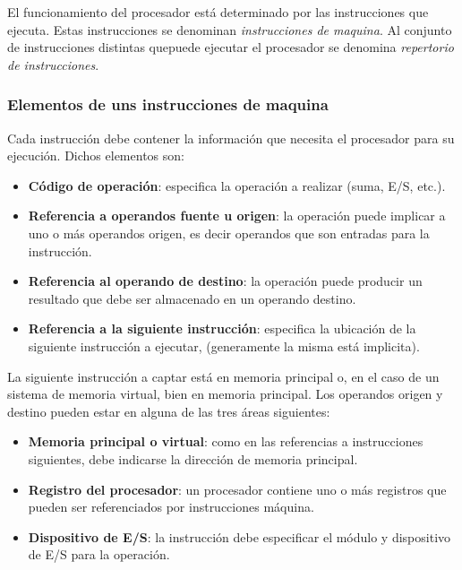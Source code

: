 El funcionamiento del procesador está determinado por las instrucciones que ejecuta. Estas instrucciones se denominan \textit{instrucciones de maquina}. Al conjunto de instrucciones distintas quepuede ejecutar el procesador se denomina \textit{repertorio de instrucciones}.

\begin{subs}
  \subsubsection{Elementos de uns instrucciones de maquina}

  Cada instrucción debe contener la información que necesita el procesador para su ejecución. Dichos elementos son:

  \begin{itemize}
    \item \textbf{Código de operación}: especifica la operación a realizar (suma, E/S, etc.).
    \item \textbf{Referencia a operandos fuente u origen}: la operación puede implicar a uno o más operandos origen, es decir operandos que son entradas para la instrucción.
    \item \textbf{Referencia al operando de destino}: la operación puede producir un resultado que debe ser almacenado en un operando destino.
    \item \textbf{Referencia a la siguiente instrucción}: especifica la ubicación de la siguiente instrucción a ejecutar, (generamente la misma está implicita).
  \end{itemize}

  La siguiente instrucción a captar está en memoria principal o, en el caso de un sistema de memoria virtual, bien en memoria principal.
  Los operandos origen y destino pueden estar en alguna de las tres áreas siguientes:
  
  \begin{itemize}
    \item \textbf{Memoria principal o virtual}: como en las referencias a instrucciones siguientes, debe indicarse la dirección de memoria principal.
    \item \textbf{Registro del procesador}: un procesador contiene uno o más registros que pueden ser referenciados por instrucciones máquina.
    \item \textbf{Dispositivo de E/S}: la instrucción debe especificar el módulo y dispositivo de E/S para la operación. 
  \end{itemize}


\end{subs}
